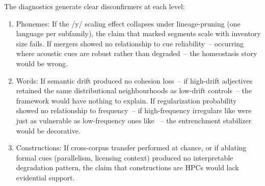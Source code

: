 The diagnostics generate clear disconfirmers at each level:

\begin{enumerate}
    \item Phonemes: If the /y/ scaling effect collapses under lineage-pruning (one language per subfamily), the claim that marked segments scale with inventory size fails. If mergers showed no relationship to cue reliability~-- occurring where acoustic cues are robust rather than degraded~-- the homeostasis story would be wrong.

    \item Words: If semantic drift produced no cohesion loss~-- if high-drift adjectives retained the same distributional neighbourhoods as low-drift controls~-- the framework would have nothing to explain. If regularization probability showed no relationship to frequency~-- if high-frequency irregulars like  were just as vulnerable as low-frequency ones like ~-- the entrenchment stabilizer would be decorative.

    \item Constructions: If cross-corpus transfer performed at chance, or if ablating formal cues (parallelism, licensing context) produced no interpretable degradation pattern, the claim that constructions are HPCs would lack evidential support.
\end{enumerate}
